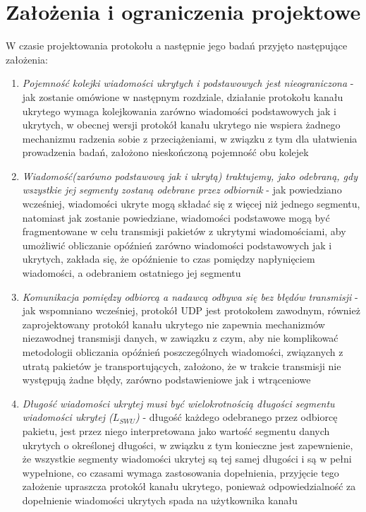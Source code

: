 \documentclass[a4paper, twoside, 12pt]{report}
\begin{document}
    \section{Założenia i ograniczenia projektowe}
    W czasie projektowania protokołu a następnie jego badań przyjęto następujące założenia:
    \begin{enumerate}
        \item \emph{Pojemność kolejki wiadomości ukrytych i podstawowych jest nieograniczona} -
            jak zostanie omówione w następnym rozdziale, działanie protokołu
            kanału ukrytego wymaga kolejkowania zarówno wiadomości podstawowych
            jak i ukrytych, w obecnej wersji protokół kanału ukrytego nie wspiera
            żadnego mechanizmu radzenia sobie z przeciążeniami, w związku z tym
            dla ułatwienia prowadzenia badań, założono nieskończoną pojemność obu kolejek

        \item \emph{Wiadomość(zarówno podstawową jak i ukrytą) traktujemy, jako odebraną,
            gdy wszystkie jej segmenty zostaną odebrane przez odbiornik} - jak powiedziano
            wcześniej, wiadomości ukryte mogą składać się z więcej niż jednego segmentu,
            natomiast jak zostanie powiedziane, wiadomości podstawowe mogą być fragmentowane
            w celu transmisji pakietów z ukrytymi wiadomościami, aby umożliwić
            obliczanie opóźnień zarówno wiadomości podstawowych jak i ukrytych,
            zakłada się, że opóźnienie to czas pomiędzy napłynięciem wiadomości,
            a odebraniem ostatniego jej segmentu

        \item \emph{Komunikacja pomiędzy odbiorcą a nadawcą odbywa się bez błędów transmisji} -
            jak wspomniano wcześniej, protokół UDP jest protokołem zawodnym, również
            zaprojektowany protokół kanału ukrytego nie zapewnia mechanizmów niezawodnej
            transmisji danych, w zawiązku z czym, aby nie komplikować metodologii
            obliczania opóźnień poszczególnych wiadomości, związanych z utratą
            pakietów je transportujących, założono, że w trakcie transmisji nie
            występują żadne błędy, zarówno podstawieniowe jak i wtrąceniowe

        \item \emph{Długość wiadomości ukrytej musi być wielokrotnością długości segmentu
            wiadomości ukrytej (\(L_{SWU}\))} - długość każdego odebranego przez odbiorcę pakietu,
            jest przez niego interpretowana jako wartość segmentu danych ukrytych o określonej
            długości, w związku z tym konieczne jest zapewnienie, że wszystkie segmenty
            wiadomości ukrytej są tej samej długości i są w pełni wypełnione, co czasami
            wymaga zastosowania dopełnienia, przyjęcie tego założenie upraszcza protokół
            kanału ukrytego, ponieważ odpowiedzialność za dopełnienie wiadomości ukrytych
            spada na użytkownika kanału
    \end{enumerate}
\end{document}

